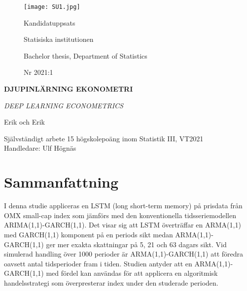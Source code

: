\documentclass[11pt]{article}
\numberwithin{equation}{section}
\numberwithin{table}{section}
\numberwithin{figure}{section}
\begin{document}
\begin{titlepage}
\thispagestyle{empty}
	\begin{figure}[ht]
			\texttt{[image: SU1.jpg]}
			
	   \endminipage
		 \Large Kandidatuppsats \par
		 \large Statisiska institutionen \par
		  \small Bachelor thesis, Department of   Statistics \par
		   \large Nr 2021:1 \par
			
\endminipage
\end{figure}
	
	
\centering
\vspace{5cm}

{\large\bfseries DJUPINLÄRNING EKONOMETRI\par}
	\vspace{0.5cm}
	
{\large\itshape DEEP LEARNING ECONOMETRICS \par}
	\vfill
	
	

{\Large Erik och Erik\par}
	\vspace{0.5cm}
	
\begin{flushleft}
Självständigt arbete 15 högskolepoäng inom Statistik III, VT2021 \\
Handledare: Ulf Högnäs\\

\end{flushleft}
\end{titlepage}


\newpage
\thispagestyle{empty}
\section*{Sammanfattning}

I denna studie appliceras en LSTM (long short-term memory) på prisdata från OMX small-cap index som jämförs med den konventionella tidsseriemodellen ARIMA(1,1)-GARCH(1,1). Det visar sig att LSTM överträffar en ARMA(1,1) med GARCH(1,1) komponent på en periods sikt medan ARMA(1,1)-GARCH(1,1) ger mer exakta skattningar på 5, 21 och 63 dagars sikt. Vid simulerad handling över 1000 perioder är ARMA(1,1)-GARCH(1,1) att föredra oavsett antal tidsperioder fram i tiden. Studien antyder att en ARMA(1,1)-GARCH(1,1) med fördel kan användas för att applicera en algoritmisk handelsstrategi som överpresterar index under den studerade perioden. 
\end{document}
